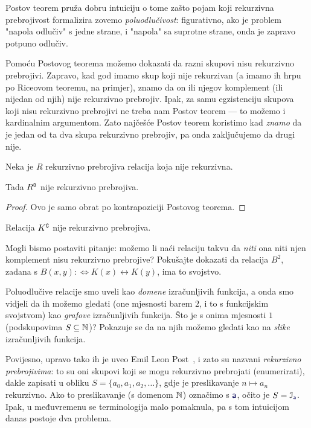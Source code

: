Postov teorem pruža dobru intuiciju o tome zašto pojam koji rekurzivna prebrojivost formalizira zovemo \emph{poluodlučivost}: figurativno, ako je problem "napola odlučiv" s jedne strane, i "napola" sa suprotne strane, onda je zapravo potpuno odlučiv.

Pomoću Postovog teorema možemo dokazati da razni skupovi nisu rekurzivno prebrojivi. Zapravo, kad god imamo skup koji nije rekurzivan (a imamo ih hrpu po Riceovom teoremu, na primjer), znamo da on ili njegov komplement (ili nijedan od njih) nije rekurzivno prebrojiv.
Ipak, za samu egzistenciju skupova koji nisu rekurzivno prebrojivi ne treba nam Postov teorem --- to možemo i kardinalnim argumentom.
Zato najčešće Postov teorem koristimo kad \emph{znamo} da je jedan od ta dva skupa rekurzivno prebrojiv, pa onda zaključujemo da drugi nije.

\begin{korolar}[{name=[kriterij za negaciju rekurzivne prebrojivosti]}]
Neka je $R$ rekurzivno prebrojiva relacija koja nije rekurzivna.

    Tada $R\sp{{\scriptscriptstyle\complement}}$ nije rekurzivno prebrojiva.
\end{korolar}
\begin{proof}
Ovo je samo obrat po kontrapoziciji Postovog teorema.
\end{proof}

\begin{primjer}[{name=[komplement Russellovog skupa nije rekurzivno prebrojiv]}]
Relacija $K\sp{{\scriptscriptstyle\complement}}$ nije rekurzivno prebrojiva.
\end{primjer}

Mogli bismo postaviti pitanje: možemo li naći relaciju takvu da \emph{niti} ona niti njen komplement nisu rekurzivno prebrojive? Pokušajte dokazati da relacija $B^2$, zadana s $B(x,y):\Longleftrightarrow K(x)\leftrightarrow K(y)$, ima to svojstvo.


Poluodlučive relacije smo uveli kao \emph{domene} izračunljivih funkcija, a onda smo vidjeli da ih možemo gledati (one mjesnosti barem $2$, i to s funkcijskim svojstvom) kao \emph{grafove} izračunljivih funkcija. Što je s onima mjesnosti $1$ (podskupovima $S\subseteq{\mathbb N}$)? Pokazuje se da na njih možemo gledati kao na \emph{slike} izračunljivih funkcija.

Povijesno, upravo tako ih je uveo Emil Leon Post~\cite{post}, i zato su nazvani \emph{rekurzivno prebrojivima}: to su oni skupovi koji se mogu rekurzivno prebrojati (enumerirati), dakle zapisati u obliku $S=\{a_0,a_1,a_2,\dotsc\}$, gdje je preslikavanje $n\mapsto a_n$ rekurzivno. Ako to preslikavanje (s domenom ${\mathbb N}$) označimo s $\f a$, očito je $S=\im{\f a}$. Ipak, u međuvremenu se terminologija malo pomaknula, pa s tom intuicijom danas postoje dva problema.


